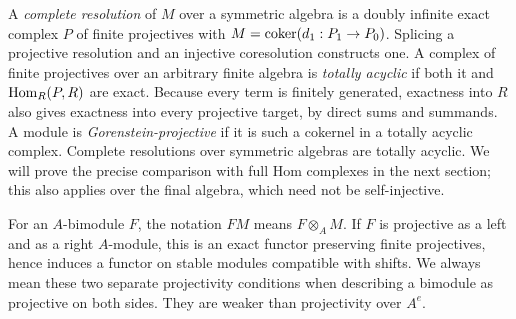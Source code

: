 A \emph{complete resolution} of $M$ over a symmetric algebra is a doubly
infinite exact complex $P$ of finite projectives with
$M=\operatorname{coker}(d_1:P_1\to P_0)$. Splicing a projective resolution and an
injective coresolution constructs one. A complex of finite projectives
over an arbitrary finite algebra is \emph{totally acyclic} if both it and
$\operatorname{Hom}_R(P,R)$ are exact. Because every term is finitely generated, exactness into $R$
also gives exactness into every projective target, by direct sums and
summands. A module is \emph{Gorenstein-projective} if it
is such a cokernel in a totally acyclic complex. Complete resolutions
over symmetric algebras are totally acyclic. We will prove the precise
comparison with full Hom complexes in the next section; this also
applies over the final algebra, which need not be self-injective.

For an $A$-bimodule $F$, the notation $FM$ means $F\otimes_A M$.
If $F$ is projective as a left and as a right $A$-module, this is an
exact functor preserving finite projectives, hence induces a functor
on stable modules compatible with shifts. We always mean these two
separate projectivity conditions when describing a bimodule as
projective on both sides. They are weaker than projectivity over $A^e$.
